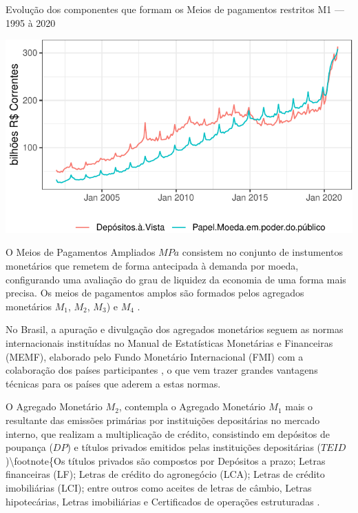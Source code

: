\documentclass[
  12pt,
  12pt,
  openright,
  oneside,
  a4paper,
  chapter=TITLE,
  section=TITLE,
  subsection=TITLE,
  subsubsection=TITLE,
  english,
  portugues,
  sumario=tradicional]{abntex2}
\begin{document}
\begin{grafico}[!hbtp]
\vspace{20pt}
\caption{Evolução dos componentes que formam os Meios de pagamentos restritos M1 — 1995 à 2020}
\vspace{-4mm}

\begin{center}\includegraphics{12-exportedfigures/m1-1} \end{center}
\vspace{-3mm}
\label{graf:m1}
\vspace{-2mm}
\end{grafico}

O Meios de Pagamentos Ampliados \(MPa\) consistem no conjunto de instumentos monetários que remetem de forma antecipada à demanda por moeda, configurando uma avaliação do grau de liquidez da economia de uma forma mais precisa. Os meios de pagamentos amplos são formados pelos agregados monetários \(M_1\), \(M_2\), \(M_3\)) e \(M_4\) \cite{sgs:mpa}.

No Brasil, a apuração e divulgação dos agregados monetários seguem as normas internacionais instituídas no Manual de Estatísticas Monetárias e Financeiras (MEMF), elaborado pelo Fundo Monetário Internacional (FMI) com a colaboração dos países participantes \cite{sgs:mpa}, o que vem trazer grandes vantagens técnicas para os países que aderem a estas normas.

O Agregado Monetário \(M_2\), contempla o Agregado Monetário \(M_1\) mais o resultante das emissões primárias por instituições depositárias no mercado interno, que realizam a multiplicação de crédito, consistindo em depósitos de poupança (\(DP\)) e títulos privados emitidos pelas instituições depositárias (\(TEID\))\textbackslash footnote\{Os títulos privados são compostos por Depósitos a prazo; Letras financeiras (LF); Letras de crédito do agronegócio (LCA); Letras de crédito imobiliárias (LCI); entre outros como aceites de letras de câmbio, Letras hipotecárias, Letras imobiliárias e Certificados de operações estruturadas \cite{sgs:mpa}.
\end{document}
